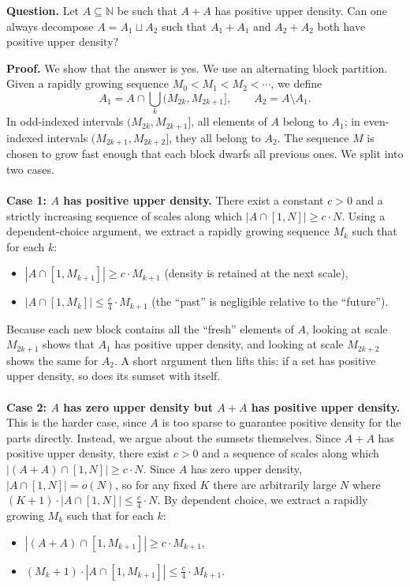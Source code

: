 
\noindent \textbf{Question.} Let $A\subseteq \mathbb{N}$ be such that $A+A$ has positive upper density. Can one always decompose $A=A_1\sqcup A_2$ such that $A_1+A_1$ and $A_2+A_2$ both have positive upper density?

\noindent \textbf{Proof.} We show that the answer is yes. We use an alternating block partition. Given a rapidly growing sequence $M_0 < M_1 < M_2 < \cdots$, we define
    $$A_1 = A \cap \bigcup_k (M_{2k}, M_{2k+1}], \qquad A_2 = A \setminus A_1.$$
    In odd-indexed intervals $(M_{2k}, M_{2k+1}]$, all elements of $A$ belong to $A_1$; in even-indexed intervals $(M_{2k+1}, M_{2k+2}]$, they all belong to $A_2$. The sequence $M$ is chosen to grow fast enough that each block dwarfs all previous ones. We split into two cases.
    \\\\
    \textbf{Case 1: $A$ has positive upper density.}
    There exist a constant $c > 0$ and a strictly increasing sequence of scales along which $|A \cap [1,N]| \ge c \cdot N$. Using a dependent-choice argument, we extract a rapidly growing sequence $M_k$ such that for each $k$:
    \begin{itemize}
        \item $|A \cap [1, M_{k+1}]| \ge c \cdot M_{k+1}$ (density is retained at the next scale),
        \item $|A \cap [1, M_k]| \le \frac{c}{4} \cdot M_{k+1}$ (the ``past'' is negligible relative to the ``future'').
    \end{itemize}
    Because each new block contains all the ``fresh'' elements of $A$, looking at scale $M_{2k+1}$ shows that $A_1$ has positive upper density, and looking at scale $M_{2k+2}$ shows the same for $A_2$. A short argument then lifts this: if a set has positive upper density, so does its sumset with itself.
    \\\\
    \textbf{Case 2: $A$ has zero upper density but $A+A$ has positive upper density.}
    This is the harder case, since $A$ is too sparse to guarantee positive density for the parts directly. Instead, we argue about the sumsets themselves. Since $A+A$ has positive upper density, there exist $c > 0$ and a sequence of scales along which $|(A+A) \cap [1,N]| \ge c \cdot N$. Since $A$ has zero upper density, $|A \cap [1,N]| = o(N)$, so for any fixed $K$ there are arbitrarily large $N$ where $(K+1) \cdot |A \cap [1,N]| \le \frac{c}{4} \cdot N$. By dependent choice, we extract a rapidly growing $M_k$ such that for each $k$:
    \begin{itemize}
        \item $|(A+A) \cap [1, M_{k+1}]| \ge c \cdot M_{k+1}$,
        \item $(M_k + 1) \cdot |A \cap [1, M_{k+1}]| \le \frac{c}{4} \cdot M_{k+1}$.
    \end{itemize}
